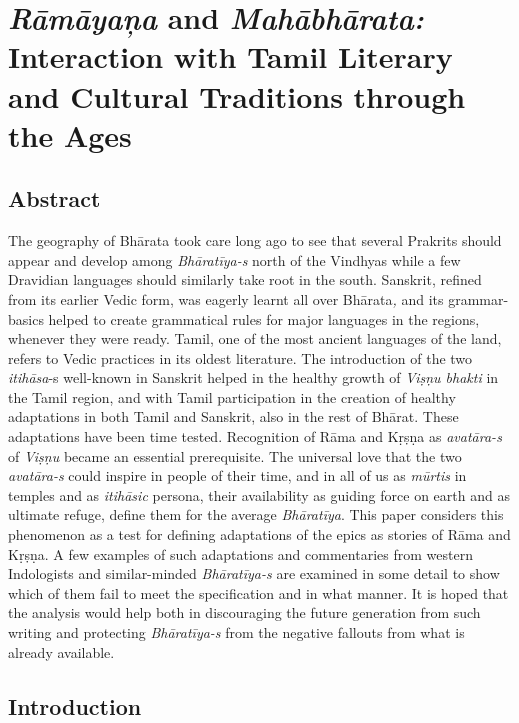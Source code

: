 
\chapter{\textit{Rāmāyaņa} and \textit{Mahābhārata:} Interaction with Tamil Literary and Cultural Traditions through the Ages}\label{chap10}



\section*{Abstract}

The geography of Bhārata took care long ago to see that several Prakrits should appear and develop among \textit{Bhāratīya-s} north of the Vindhyas while a few Dravidian languages should similarly take root in the south. Sanskrit, refined from its earlier Vedic form, was eagerly learnt all over Bhārata\textit{,} and its grammar-basics helped to create grammatical rules for major languages in the regions, whenever they were ready. Tamil, one of the most ancient languages of the land, refers to Vedic practices in its oldest literature. The introduction of the two \textit{itihāsa}-s well-known in Sanskrit helped in the healthy growth of \textit{Viṣṇu bhakti} in the Tamil region, and with Tamil participation in the creation of healthy adaptations in both Tamil and Sanskrit, also in the rest of Bhārat. These adaptations have been time tested. Recognition of Rāma and Kṛṣṇa as \textit{avatāra-s} of \textit{Viṣṇu} became an essential prerequisite. The universal love that the two \textit{avatāra-s} could inspire in people of their time, and in all of us as \textit{mūrtis} in temples and as \textit{itihāsic} persona, their availability as guiding force on earth and as ultimate refuge, define them for the average \textit{Bhāratīya}. This paper considers this phenomenon as a test for defining adaptations of the epics as stories of Rāma and Kṛṣṇa. A few examples of such adaptations and commentaries from western Indologists and similar-minded \textit{Bhāratīya-s} are examined in some detail to show which of them fail to meet the specification and in what manner. It is hoped that the analysis would help both in discouraging the future generation from such writing and protecting \textit{Bhāratīya-s} from the negative fallouts from what is already available.


\section*{Introduction}

